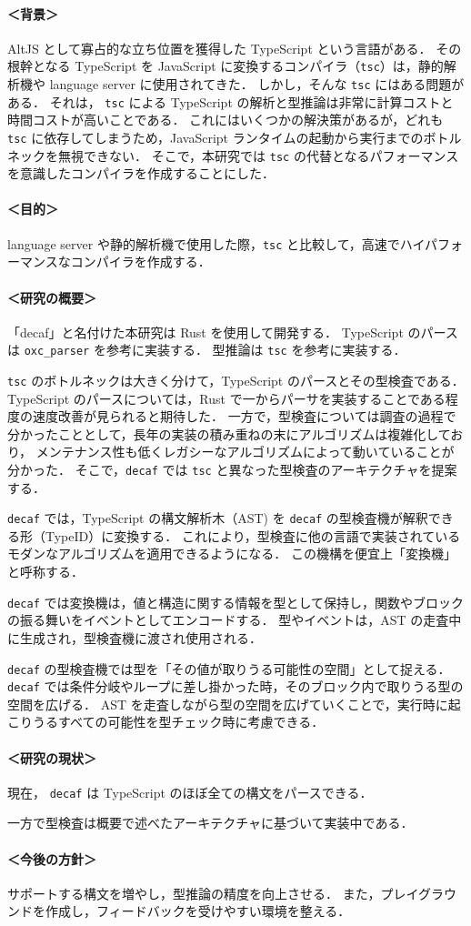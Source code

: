 \documentclass[dvipdfmx]{classes/tyukan}
\begin{document}
\paragraph{＜背景＞}
AltJS として寡占的な立ち位置を獲得した TypeScript という言語がある．
その根幹となる TypeScript を JavaScript に変換するコンパイラ（\texttt{tsc}）は，静的解析機や
language server に使用されてきた．
しかし，そんな \texttt{tsc} にはある問題がある．
それは， \texttt{tsc} による TypeScript の解析と型推論は非常に計算コストと時間コストが高いことである．
これにはいくつかの解決策があるが，どれも \texttt{tsc} に依存してしまうため，JavaScript
ランタイムの起動から実行までのボトルネックを無視できない．
そこで，本研究では \texttt{tsc} の代替となるパフォーマンスを意識したコンパイラを作成することにした．

\paragraph{＜目的＞}
language server や静的解析機で使用した際，\texttt{tsc} と比較して，高速でハイパフォーマンスなコンパイラを作成する．

\paragraph{＜研究の概要＞}
「decaf」と名付けた本研究は Rust を使用して開発する．
TypeScript のパースは \texttt{oxc\_parser} を参考に実装する．
型推論は \texttt{tsc} を参考に実装する．

\texttt{tsc} のボトルネックは大きく分けて，TypeScript のパースとその型検査である．
TypeScript のパースについては，Rust で一からパーサを実装することである程度の速度改善が見られると期待した．
一方で，型検査については調査の過程で分かったこととして，長年の実装の積み重ねの末にアルゴリズムは複雑化しており，
メンテナンス性も低くレガシーなアルゴリズムによって動いていることが分かった．
そこで，\texttt{decaf} では \texttt{tsc} と異なった型検査のアーキテクチャを提案する．

\texttt{decaf} では，TypeScript の構文解析木（AST) を \texttt{decaf}
の型検査機が解釈できる形（TypeID）に変換する．
これにより，型検査に他の言語で実装されているモダンなアルゴリズムを適用できるようになる．
この機構を便宜上「変換機」と呼称する．

\texttt{decaf} では変換機は，値と構造に関する情報を型として保持し，関数やブロックの振る舞いをイベントとしてエンコードする．
型やイベントは，AST の走査中に生成され，型検査機に渡され使用される．

\texttt{decaf} の型検査機では型を「その値が取りうる可能性の空間」として捉える．
\texttt{decaf} では条件分岐やループに差し掛かった時，そのブロック内で取りうる型の空間を広げる．
AST を走査しながら型の空間を広げていくことで，実行時に起こりうるすべての可能性を型チェック時に考慮できる．

\paragraph{＜研究の現状＞}
現在， \texttt{decaf} は TypeScript のほぼ全ての構文をパースできる．

一方で型検査は概要で述べたアーキテクチャに基づいて実装中である．

\paragraph{＜今後の方針＞}
サポートする構文を増やし，型推論の精度を向上させる．
また，プレイグラウンドを作成し，フィードバックを受けやすい環境を整える．
\end{document}
